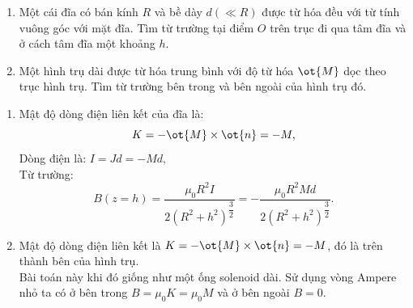 \begin{vd}[Độ từ hóa]
\begin{enumerate}[1)]
    \item Một cái đĩa có bán kính $R$ và bề dày $d(\ll R)$ được từ hóa đều với từ tính vuông góc với mặt đĩa. Tìm từ trường tại điểm $O$ trên trục đi qua tâm đĩa và ở cách tâm đĩa một khoảng $h$. 
    \item Một hình trụ dài được từ hóa trung bình với độ từ hóa $\ot{M}$ dọc theo trục hình trụ. Tìm từ trường bên trong và bên ngoài của hình trụ đó.
\end{enumerate}
\end{vd}
\begin{loigiai}
\begin{enumerate}[1) ]
    \item Mật độ dòng điện liên kết của đĩa là:
    \[K=-\ot{M}\times\ot{n}=-M,\]
    Dòng điện là: $I=Jd=-Md,$\\
    Từ trường:
    \[B(z=h)=\dfrac{\mu_0R^2I}{2(R^2+h^2)^{\dfrac{3}{2}}}=-\dfrac{\mu_0R^2Md}{2(R^2+h^2)^{\dfrac{3}{2}}}.\]
    \item Mật độ dòng điện liên kết là $K=-\ot{M}\times\ot{n}=-M$, đó là trên thành bên của hình trụ.\\
    Bài toán này khi đó giống như một ống solenoid dài. Sử dụng vòng Ampere nhỏ ta có ở bên trong $B=\mu_0K=\mu_0M$ và ở bên ngoài $B=0$.
\end{enumerate}
\end{loigiai} 

